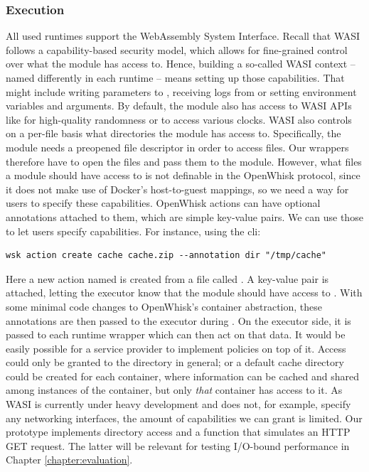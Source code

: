 \subsubsection{Execution}

All used runtimes support the WebAssembly System Interface. Recall that WASI follows a capability-based security model, which allows for fine-grained control over what the module has access to. Hence, building a so-called WASI context -- named differently in each runtime -- means setting up those capabilities. That might include writing parameters to , receiving logs from  or setting environment variables and  arguments. By default, the module also has access to WASI APIs like  for high-quality randomness or  to access various clocks. WASI also controls on a per-file basis what directories the module has access to. Specifically, the module needs a preopened file descriptor in order to access files. Our wrappers therefore have to open the files and pass them to the module. However, what files a module should have access to is not definable in the OpenWhisk protocol, since it does not make use of Docker's host-to-guest mappings, so we need a way for users to specify these capabilities. OpenWhisk actions can have optional annotations attached to them, which are simple key-value pairs. We can use those to let users specify capabilities. For instance, using the  cli:

\begin{verbatim}
wsk action create cache cache.zip --annotation dir "/tmp/cache"
\end{verbatim}

Here a new action named  is created from a file called . A key-value pair  is attached, letting the executor know that the module should have access to . With some minimal code changes to OpenWhisk's container abstraction, these annotations are then passed to the executor during . On the executor side, it is passed to each runtime wrapper which can then act on that data. It would be easily possible for a service provider to implement policies on top of it. Access could only be granted to the  directory in general; or a default cache directory  could be created for each container, where information can be cached and shared among instances of the container, but only \emph{that} container has access to it. As WASI is currently under heavy development and does not, for example, specify any networking interfaces, the amount of capabilities we can grant is limited. Our prototype implements directory access and a function that simulates an HTTP GET request. The latter will be relevant for testing I/O-bound performance in Chapter \ref{chapter:evaluation}.


